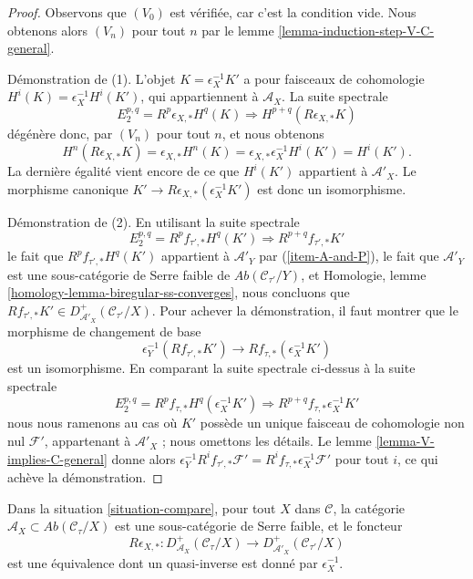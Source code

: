\begin{proof}
Observons que $(V_0)$ est vérifiée, car c'est la condition vide.
Nous obtenons alors $(V_n)$ pour tout $n$ par le
lemme \ref{lemma-induction-step-V-C-general}.

\medskip\noindent
Démonstration de (1). L'objet $K = \epsilon_X^{-1}K'$ a pour faisceaux de
cohomologie $H^i(K) = \epsilon_X^{-1}H^i(K')$, qui appartiennent à
$\mathcal{A}_X$. La suite spectrale
$$
E_2^{p, q} = R^p\epsilon_{X, *} H^q(K) \Rightarrow
H^{p + q}(R\epsilon_{X, *}K)
$$
dégénère donc, par $(V_n)$ pour tout $n$, et nous obtenons
$$
H^n(R\epsilon_{X, *}K) = \epsilon_{X, *}H^n(K) =
\epsilon_{X, *}\epsilon_X^{-1}H^i(K') = H^i(K').
$$
La dernière égalité vient encore de ce que $H^i(K')$ appartient à
$\mathcal{A}'_X$. Le morphisme canonique
$K' \to R\epsilon_{X, *}(\epsilon_X^{-1}K')$ est donc un isomorphisme.

\medskip\noindent
Démonstration de (2). En utilisant la suite spectrale
$$
E_2^{p, q} = R^pf_{\tau', *}H^q(K') \Rightarrow R^{p + q}f_{\tau', *}K'
$$
le fait que $R^pf_{\tau', *}H^q(K')$ appartient à
$\mathcal{A}'_Y$ par (\ref{item-A-and-P}), le fait que $\mathcal{A}'_Y$ est
une sous-catégorie de Serre faible de
$\textit{Ab}(\mathcal{C}_{\tau'}/Y)$, et Homologie, lemme
\ref{homology-lemma-biregular-ss-converges}, nous concluons que
$Rf_{\tau', *}K' \in D^+_{\mathcal{A}'_X}(\mathcal{C}_{\tau'}/X)$.
Pour achever la démonstration, il faut montrer que le morphisme de changement
de base
$$
\epsilon_Y^{-1}(Rf_{\tau', *}K')
\longrightarrow
Rf_{\tau, *}(\epsilon_X^{-1}K')
$$
est un isomorphisme. En comparant la suite spectrale ci-dessus à la suite
spectrale
$$
E_2^{p, q} = R^pf_{\tau, *}H^q(\epsilon_X^{-1}K')
\Rightarrow R^{p + q}f_{\tau, *}\epsilon_X^{-1}K'
$$
nous nous ramenons au cas où $K'$ possède un unique faisceau de cohomologie
non nul $\mathcal{F}'$, appartenant à $\mathcal{A}'_X$ ; nous omettons les
détails. Le lemme \ref{lemma-V-implies-C-general} donne alors
$\epsilon_Y^{-1}R^if_{\tau', *}\mathcal{F}' =
R^if_{\tau, *}\epsilon_X^{-1}\mathcal{F}'$ pour tout $i$,
ce qui achève la démonstration.
\end{proof}

\begin{lemma}
\label{lemma-cohomological-descent-general}
Dans la situation \ref{situation-compare}, pour tout $X$ dans
$\mathcal{C}$, la catégorie
$\mathcal{A}_X \subset \textit{Ab}(\mathcal{C}_\tau/X)$
est une sous-catégorie de Serre faible, et le foncteur
$$
R\epsilon_{X, *} :
D^+_{\mathcal{A}_X}(\mathcal{C}_\tau/X)
\longrightarrow
D^+_{\mathcal{A}'_X}(\mathcal{C}_{\tau'}/X)
$$
est une équivalence dont un quasi-inverse est donné par $\epsilon_X^{-1}$.
\end{lemma}

